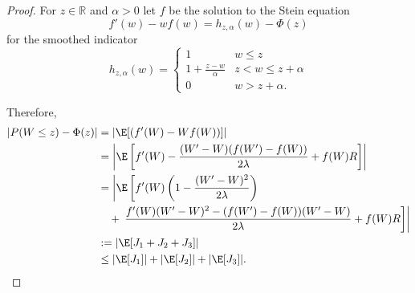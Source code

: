 \begin{proof}
  For $z \in \mathbb{R}$ and $\alpha > 0$ let $f$ be the solution to the Stein equation 
  \begin{equation}
    f'(w) - wf(w) = h_{z,\alpha}(w) - \Phi(z)
  \end{equation}
  for the smoothed indicator
  \begin{equation}
    h_{z,\alpha}(w) =
    \begin{cases}
      1 & w \leq z \\
      1 + \frac{z-w}{\alpha} & z < w \leq z + \alpha \\
      0 & w > z + \alpha.
    \end{cases}
  \end{equation}

  Therefore,
  \begin{equation}
    \label{eq:triple-bound}
    \begin{split}
      |P(W \leq z) - \Phi(z)| &= |\E [(f'(W)-Wf(W))] | \\
      &= \left | \E \left [ 
          f'(W) - \frac{(W'-W)(f(W')-f(W))}{2\lambda} +f(W)R
        \right ]\right | \\
      &= \left | \E \left [f'(W)\left (1-\frac{(W'-W)^2}{2\lambda}\right) \right . \right . \\
      &\quad + \left . \left . 
          \frac{f'(W)(W'-W)^2-(f(W')-f(W))(W'-W)}{2\lambda} + f(W)R
        \right ] \right | \\
      &:= | \E [J_1 + J_2 + J_3] | \\
      &\leq |\E [J_1]| + |\E [J_2]| + |\E [J_3]|.
    \end{split}
  \end{equation}


\end{proof}

